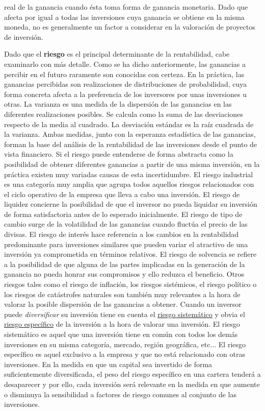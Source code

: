 \documentclass{nuevotema}
\begin{document}
real de la ganancia cuando ésta toma forma de ganancia monetaria. Dado que afecta por igual a todas las inversiones cuya ganancia se obtiene en la misma moneda, no es generalmente un factor a considerar en la valoración de proyectos de inversión. 

Dado que el \textbf{riesgo} es el principal determinante de la rentabilidad, cabe examinarlo con más detalle. Como se ha dicho anteriormente, las ganancias a percibir en el futuro raramente son conocidas con certeza. En la práctica, las ganancias percibidas son realizaciones de distribuciones de probabilidad, cuya forma concreta afecta a la preferencia de los inversores por unas inversiones u otras. La varianza es una medida de la dispersión de las ganancias en las diferentes realizaciones posibles. Se calcula como la suma de las desviaciones respecto de la media al cuadrado. La desviación estándar es la raíz cuadrada de la varianza. Ambas medidas, junto con la esperanza estadística de las ganancias, forman la base del análisis de la rentabilidad de las inversiones desde el punto de vista financiero. Si el riesgo puede entenderse de forma abstracta como la posibilidad de obtener diferentes ganancias a partir de una misma inversión, en la práctica existen muy variadas causas de esta incertidumbre. El riesgo industrial es una categoría muy amplia que agrupa todos aquellos riesgos relacionados con el ciclo operativo de la empresa que lleva a cabo una inversión. El riesgo de liquidez concierne la posibilidad de que el inversor no pueda liquidar su inversión de forma satisfactoria antes de lo esperado inicialmente. El riesgo de tipo de cambio surge de la volatilidad de las ganancias cuando fluctúa el precio de las divisas. El riesgo de interés hace referencia a los cambios en la rentabilidad predominante para inversiones similares que pueden variar el atractivo de una inversión ya comprometida en términos relativos. El riesgo de solvencia se refiere a la posibilidad de que alguna de las partes implicadas en la generación de la ganancia no pueda honrar sus compromisos y ello reduzca el beneficio. Otros riesgos tales como el riesgo de inflación, los riesgos sistémicos, el riesgo político o los riesgos de catástrofes naturales son también muy relevantes a la hora de valorar la posible dispersión de las ganancias a obtener. Cuando un inversor puede \textit{diversificar} su inversión tiene en cuenta el \underline{riesgo sistemático} y obvia el \underline{riesgo específico} de la inversión a la hora de valorar una inversión. El riesgo sistemático es aquel que una inversión tiene en común con todos los demás inversiones en su misma categoría, mercado, región geográfica, etc... El riesgo específico es aquel exclusivo a la empresa y que no está relacionado con otras inversiones. En la medida en que un capital sea invertido de forma suficientemente diversificada, el peso del riesgo específico en una cartera tenderá a desaparecer y por ello, cada inversión será relevante en la medida en que aumente o disminuya la sensibilidad a factores de riesgo comunes al conjunto de las inversiones. 
\end{document}
